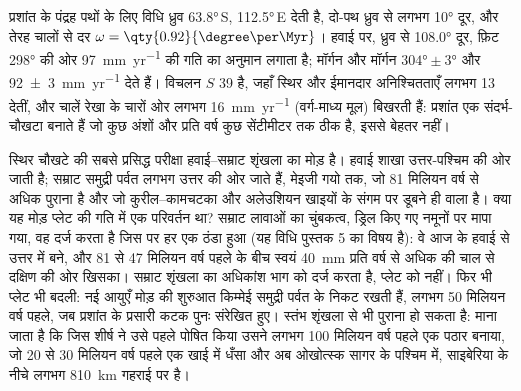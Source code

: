 प्रशांत के पंद्रह पथों के लिए विधि ध्रुव \ang{63.8}\,S, \ang{112.5}\,E देती है, दो-पथ ध्रुव से लगभग \ang{10} दूर, और तेरह चालों से दर $\omega = \qty{0.92}{\degree\per\Myr}$। हवाई पर, ध्रुव से \ang{108.0} दूर, फ़िट \ang{298} की ओर \qty{97}{mm.yr^{-1}} की गति का अनुमान लगाता है; मॉर्गन और मॉर्गन $\ang{304}\pm\ang{3}$ और \qty[uncertainty-mode=separate]{92 \pm 3}{mm.yr^{-1}} देते हैं। विचलन $S$ 39 है, जहाँ स्थिर  और ईमानदार अनिश्चितताएँ लगभग 13 देतीं, और चालें रेखा के चारों ओर लगभग \qty{16}{mm.yr^{-1}} (वर्ग-माध्य मूल) बिखरती हैं: प्रशांत  एक संदर्भ-चौखटा बनाते हैं जो कुछ अंशों और प्रति वर्ष कुछ सेंटीमीटर तक ठीक है, इससे बेहतर नहीं।

स्थिर चौखटे की सबसे प्रसिद्ध परीक्षा हवाई–सम्राट शृंखला का मोड़ है। हवाई शाखा उत्तर-पश्चिम की ओर जाती है; सम्राट समुद्री पर्वत लगभग उत्तर की ओर जाते हैं, मेइजी गयो तक, जो 81 मिलियन वर्ष से अधिक पुराना है और जो कुरील–कामचटका और अलेउशियन खाइयों के संगम पर डूबने ही वाला है। क्या यह मोड़ प्लेट की गति में एक परिवर्तन था? सम्राट लावाओं का चुंबकत्व, ड्रिल किए गए नमूनों पर मापा गया, वह  दर्ज करता है जिस पर हर एक ठंडा हुआ (यह विधि पुस्तक 5 का विषय है): वे आज के हवाई से उत्तर में बने, और 81 से 47 मिलियन वर्ष पहले के बीच  स्वयं \qty{40}{mm} प्रति वर्ष से अधिक की चाल से दक्षिण की ओर खिसका। सम्राट शृंखला का अधिकांश भाग  को दर्ज करता है, प्लेट को नहीं। फिर भी प्लेट भी बदली: नई आयुएँ मोड़ की शुरुआत किम्मेई समुद्री पर्वत के निकट रखती हैं, लगभग 50 मिलियन वर्ष पहले, जब प्रशांत के प्रसारी कटक पुनः संरेखित हुए। स्तंभ शृंखला से भी पुराना हो सकता है: माना जाता है कि जिस शीर्ष ने उसे पहले पोषित किया उसने लगभग 100 मिलियन वर्ष पहले एक पठार बनाया, जो 20 से 30 मिलियन वर्ष पहले एक खाई में धँसा और अब ओखोत्स्क सागर के पश्चिम में, साइबेरिया के नीचे लगभग \qty{810}{km} गहराई पर है।

